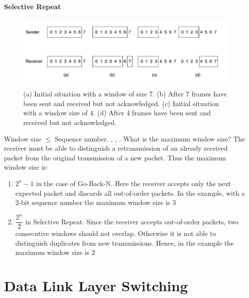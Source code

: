 \documentclass[a4paper,oneside]{book}
\begin{document}
\subsubsection{Selective Repeat}
\begin{figure}[H]
\caption{(a) Initial situation with a window of size 7. (b) After 7 frames have been sent and received but not acknowledged. (c) Initial situation with a window size of 4. (d) After 4 frames have been sent and received but not acknowledged.}
\includegraphics[scale=0.6]{Images/selectiverepeat}
\label{fig:cn_selective_repeat}
\end{figure}
Window size $\le$ Sequence number. \cite{selectiverepeat1}, \cite{selectiverepeat}, \cite{srgobackn}.
What is the maximum window size? The receiver must be able to distinguish a retransmission of an already received packet from the original transmission of a new packet. Thus the maximum window size is:
\begin{enumerate}
\item $2^n - 1$ in the case of Go-Back-N. Here the receiver accepts only the next expected packet and discards all out-of-order packets. In the example, with a 2-bit sequence number the maximum window size is 3
\item $\dfrac{2^n}{2}$ in Selective Repeat. Since the receiver accepts out-of-order packets, two consecutive windows should not overlap. Otherwise it is not able to distinguish duplicates from new transmissions. Hence, in the example the maximum window size is 2
\end{enumerate}
\chapter{Data Link Layer Switching}
\end{document}
